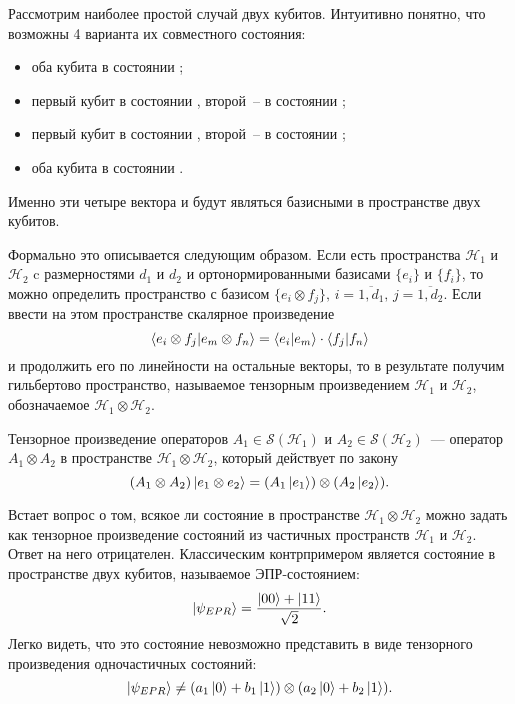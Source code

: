 Рассмотрим наиболее простой случай двух кубитов. Интуитивно понятно, что возможны 4 варианта их совместного состояния:
\begin{itemize}
  \item оба кубита в состоянии ;
  \item первый кубит в состоянии , второй~-- в состоянии ;
  \item первый кубит в состоянии , второй~-- в состоянии ;
  \item оба кубита в состоянии .
\end{itemize}
Именно эти четыре вектора и будут являться базисными в пространстве двух кубитов.

Формально это описывается следующим образом. Если есть пространства $\mathcal{H}_1$ и $\mathcal{H}_2$ c размерностями $d_1$ и $d_2$ и ортонормированными базисами $\{e_i\}$ и $\{f_i\}$, то можно определить пространство с базисом $\{e_i \otimes f_j\},\, i = \overline{1,d_1},\, j = \overline{1,d_2}$. Если ввести на этом пространстве скалярное произведение
\begin{equation}
  \left\langle e_i \otimes f_j|e_m \otimes f_n\right\rangle = \left\langle e_i|e_m\right\rangle \cdot \left\langle f_j|f_n\right\rangle 
\end{equation}
 и продолжить его по линейности на остальные векторы, то в результате получим гильбертово пространство, называемое тензорным произведением $\mathcal{H}_1$ и $\mathcal{H}_2$, обозначаемое $\mathcal{H}_1 \otimes \mathcal{H}_2$.

Тензорное произведение операторов $A_1 \in \mathcal{S}(\mathcal{H}_1)$ и $A_2 \in \mathcal{S}(\mathcal{H}_2)$~--- оператор $A_1 \otimes A_2$ в пространстве $\mathcal{H}_1 \otimes \mathcal{H}_2$, который действует по закону
\begin{equation} 
  (A_1 \otimes A_2)\left| e_1 \otimes e_2 \right\rangle = (A_1\left| e_1 \right\rangle)\otimes(A_2\left| e_2 \right\rangle). 
\end{equation}

Встает вопрос о том, всякое ли состояние в пространстве $\mathcal{H}_1 \otimes \mathcal{H}_2$ можно задать как тензорное произведение состояний из частичных пространств $\mathcal{H}_1$ и $\mathcal{H}_2$. Ответ на него отрицателен.
Классическим контрпримером является состояние в пространстве двух кубитов, называемое ЭПР-состоянием:
\begin{equation}\label{epr_state}  
  \left| \psi_{EPR} \right\rangle = \frac{\left| 00 \right\rangle + \left| 11 \right\rangle}{\sqrt{2}}.
\end{equation}
Легко видеть, что это состояние невозможно представить в виде тензорного произведения одночастичных состояний: 
\begin{equation}
  \left| \psi_{EPR} \right\rangle \neq (a_1\left| 0 \right\rangle + b_1\left| 1 \right\rangle) \otimes (a_2 \left| 0 \right\rangle + b_2 \left| 1 \right\rangle).
\end{equation}

